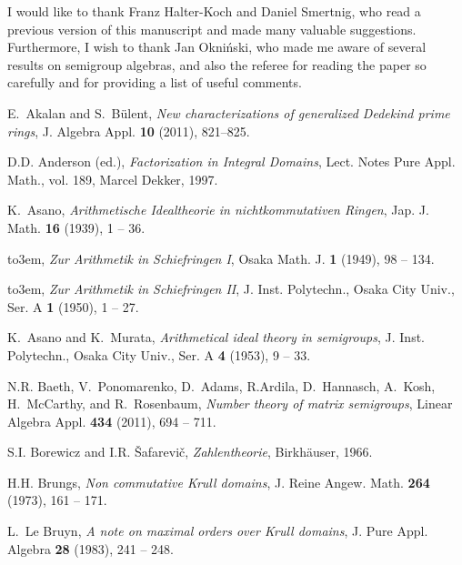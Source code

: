 \documentclass[a4paper]{amsart}
\theoremstyle{definition}
\numberwithin{equation}{section}
\begin{document}
\bigskip
{} I would like to thank Franz
Halter-Koch and Daniel Smertnig, who read a previous version of this
manuscript and made many valuable suggestions. Furthermore, I wish to thank Jan Okni{\'n}ski, who made me aware of several results on semigroup algebras, and also the referee for reading the paper so carefully and for providing a list of useful comments.

\bigskip
\providecommand{\bysame}{\leavevmode\hbox to3em{\hrulefill}\thinspace}
\providecommand{\MR}{\relax\ifhmode\unskip\space\fi MR }
\providecommand{\MRhref}[2]{  \href{http://www.ams.org/mathscinet-getitem?mr=#1}{#2}
}
\providecommand{\href}[2]{#2}
\begin{thebibliography}{10}

E.~Akalan and S.~B{\"u}lent, \emph{New characterizations of generalized
  {D}edekind prime rings}, J. Algebra Appl. \textbf{10} (2011), 821--825.

D.D. Anderson (ed.), \emph{Factorization in {I}ntegral {D}omains}, Lect. Notes
  Pure Appl. Math., vol. 189, Marcel Dekker, 1997.

K.~Asano, \emph{Arithmetische {I}dealtheorie in nichtkommutativen {R}ingen},
  Jap. J. Math. \textbf{16} (1939), 1 -- 36.

\bysame, \emph{Zur {A}rithmetik in {S}chiefringen {I}}, Osaka Math. J.
  \textbf{1} (1949), 98 -- 134.

\bysame, \emph{Zur {A}rithmetik in {S}chiefringen {II}}, J. Inst. Polytechn.,
  Osaka City Univ., Ser. A \textbf{1} (1950), 1 -- 27.

K.~Asano and K.~Murata, \emph{Arithmetical ideal theory in semigroups}, J.
  Inst. Polytechn., Osaka City Univ., Ser. A \textbf{4} (1953), 9 -- 33.

N.R. Baeth, V.~Ponomarenko, D.~Adams, R.Ardila, D.~Hannasch, A.~Kosh,
  H.~McCarthy, and R.~Rosenbaum, \emph{Number theory of matrix semigroups},
  Linear Algebra Appl. \textbf{434} (2011), 694 -- 711.

S.I. Borewicz and I.R. \v{S}afarevi\v{c}, \emph{Zahlentheorie},
  Birkh{\"{a}}user, 1966.

H.H. Brungs, \emph{Non commutative {K}rull domains}, J. Reine Angew. Math.
  \textbf{264} (1973), 161 -- 171.

L.~Le Bruyn, \emph{A note on maximal orders over {K}rull domains}, J. Pure
  Appl. Algebra \textbf{28} (1983), 241 -- 248.


\end{thebibliography}
\end{document}
